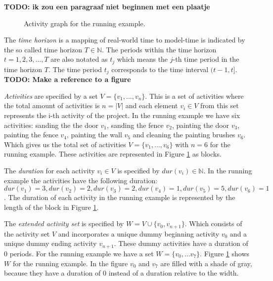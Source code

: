 \documentclass{article}
\theoremstyle{definition}
\newcommand{\TODO}[1]{{\color{red}\textbf{TODO: #1}}}
\newcommand{\dur}[1]{\ensuremath{dur(v_{#1})}} %
\begin{document}
\TODO{ik zou een paragraaf niet beginnen met een plaatje}

\begin{figure}[ht]
	\centering
	
	\caption{Activity graph for the running example.}
	\label{fig:activity_graph}
\end{figure}

The \emph{time horizon} is a mapping of real-world time to model-time is indicated by the so called time horizon $T \in \mathbb{N}$.
The periods within the time horizon $t=1,2,3,\ldots,T$ are also notated as $t_j$ which means the $j$-th time period in the time horizon $T$. 
The time period $t_j$ corresponds to the time interval $(t-1,t]$. 
\TODO{Make a reference to a figure}

\emph{Activities} are specified by a set $V = \{v_1, \ldots, v_n\}$.
This is a set of activities where the total amount of activities is $n = |V|$ and each element $v_i \in V$ from this set represents the i-th activity of the project.
In the running example we have six activities: sanding the the door $v_1$, sanding the fence $v_2$,  painting the door $v_3$, painting the fence $v_4$, painting the wall $v_5$ and cleaning the painting brushes $v_6$. 
Which gives us the total set of activities $V = \{v_1, \ldots, v_6\}$ with $n = 6$ for the running example.
These activities are represented in Figure \ref{fig:activity_graph} as blocks.

The \emph{duration} for each activity $v_i \in V$ is specified by $\dur{i} \in \mathbb{N}$.
In the running example the activities have the following duration: $\dur{1} = 3, \dur{2} = 2, \dur{3} = 2, \dur{4} = 1, \dur{5} = 5, \dur{6} = 1$. 
The duration of each activity in the running example is represented by the length of the block in Figure \ref{fig:activity_graph}.

The \emph{extended activity set} is specified by $W = V \cup \{v_0, v_{n+1}\}$.
Which consists of the activity set $V$ and incorporates a unique dummy beginning activity $v_0$ and a unique dummy ending activity $v_{n+1}$. 
These dummy activities have a duration of $0$ periods.
For the running example we have a set $W = \{v_0, \ldots v_7\}$.
Figure \ref{fig:activity_graph} shows $W$ for the running example.
In the figure $v_0$ and $v_7$ are filled with a shade of gray, because they have a duration of $0$ instead of a duration relative to the width. 
\end{document}
